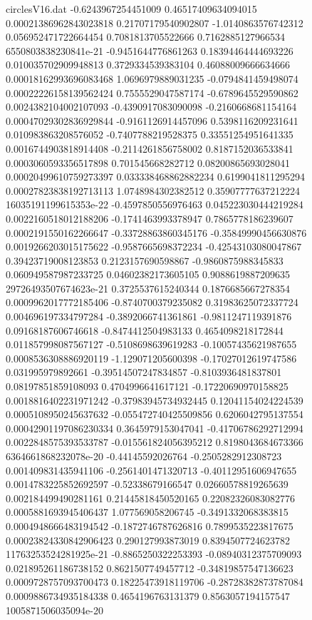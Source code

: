 \begin{filecontents}{circlesV16.dat}
-0.6243967254451009	0.46517409634094015	0.00021386962843023818
0.21707179540902807	-1.0140863576742312	0.056952471722664454
0.7081813705522666	0.7162885127966534	6550803838230841e-21
-0.9451644776861263	0.18394464444693226	0.010035702909948813
0.3729334539383104	0.46088009666634666	0.00018162993696083468
1.0696979889031235	-0.0794841459498074	0.00022226158139562424
0.7555529047587174	-0.6789645529590862	0.0024382104002107093
-0.4390917083090098	-0.2160668681154164	0.00047029302836929844
-0.9161126914457096	0.5398116209231641	0.010983863208576052
-0.7407788219528375	0.33551254951641335	0.0016744903818914408
-0.2114261856758002	0.8187152036533841	0.0003060593356517898
0.701545668282712	0.08200865693028041	0.00020499610759273397
0.033338468862882234	0.6199041811295294	0.00027823838192713113
1.0748984302382512	0.35907777637212224	16035191199615353e-22
-0.4597850556976463	0.045223030444219284	0.0022160518012188206
-0.1741463993378947	0.7865778186239607	0.0002191550162266647
-0.33728863860345176	-0.35849990456630876	0.0019266203015175622
-0.9587665698372234	-0.42543103080047867	0.39423719008123853
0.2123157690598867	-0.9860875988345833	0.060949587987233725
0.04602382173605105	0.9088619887209635	29726493507674623e-21
0.3725537615240344	0.1876685667278354	0.0009962017772185406
-0.8740700379235082	0.31983625072337724	0.004696197334797284
-0.3892066741361861	-0.9811247119391876	0.09168187606746618
-0.8474412504983133	0.4654098218172844	0.011857998087567127
-0.5108698639619283	-0.10057435621987655	0.0008536308886920119
-1.129071205600398	-0.17027012619747586	0.031995979892661
-0.39514507247834857	-0.8103936481837801	0.08197851859108093
0.4704996641617121	-0.17220690970158825	0.0018816402231971242
-0.37983945734932445	0.12041154024224539	0.0005108950245637632
-0.055472740425509856	0.6206042795137554	0.00042901197086230334
0.3645979153047041	-0.41706786292712994	0.0022848575393533787
-0.015561824056395212	0.8198043684673366	6364661868232078e-20
-0.44145592026764	-0.2505282912308723	0.001409831435941106
-0.2561401471320713	-0.40112951606947655	0.0014783225852692597
-0.52338679166547	0.02660578819265639	0.002184499490281161
0.21445818450520165	0.22082326083082776	0.0005881693945406437
1.077569058206745	-0.3491332068383815	0.0004948666483194542
-0.1872746787626816	0.7899535223817675	0.00023824330842906423
0.290127993873019	0.8394507724623782	11763253524281925e-21
-0.8865250322253393	-0.08940312375709093	0.021895261186738152
0.8621507749457712	-0.34819857547136623	0.0009728757093700473
0.18225473918119706	-0.28728382873787084	0.0009886734935184338
0.4654196763131379	0.8563057194157547	1005871506035094e-20

\end{filecontents}
